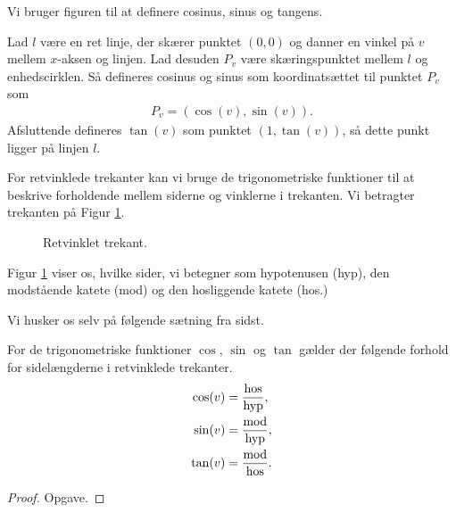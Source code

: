 Vi bruger figuren til at definere cosinus, sinus og tangens.
\begin{defn}
	Lad $l$ være en ret linje, der skærer punktet $(0,0)$ og danner en vinkel på $v$ mellem $x$-aksen og 
	linjen. Lad desuden $P_v$ være skæringspunktet mellem $l$ og enhedscirklen. Så defineres cosinus og sinus 
	som koordinatsættet til punktet $P_v$ som
	\begin{align*}
		P_v = (\cos(v),\sin(v)).
	\end{align*}
	Afsluttende defineres $\tan(v)$ som punktet $(1,\tan(v))$, så dette punkt ligger på linjen $l$.
\end{defn}

For retvinklede trekanter kan vi bruge de trigonometriske funktioner til at beskrive forholdende mellem siderne og vinklerne i trekanten. Vi betragter trekanten på Figur \ref{fig:retvinklet}.

\begin{figure}[H]
	\centering
	\caption{Retvinklet trekant.}
	\label{fig:retvinklet}
\end{figure}
Figur \ref{fig:retvinklet} viser os, hvilke sider, vi betegner som hypotenusen (hyp), den modstående katete (mod) og den hosliggende katete (hos.)

Vi husker os selv på følgende sætning fra sidst.
\begin{setn}\label{setn:trigretvinkel}
	For de trigonometriske funktioner $\cos$, $\sin$ og $\tan$ gælder der følgende forhold for sidelængderne i 
	retvinklede trekanter.
	\begin{align*}
		\cos(v) &= \frac{\textnormal{hos}}{\textnormal{hyp}},\\
		\sin(v) &= \frac{\textnormal{mod}}{\textnormal{hyp}},\\
		\tan(v) &= \frac{\textnormal{mod}}{\textnormal{hos}}.
	\end{align*}
\end{setn}
\begin{proof}
	Opgave.
\end{proof}

